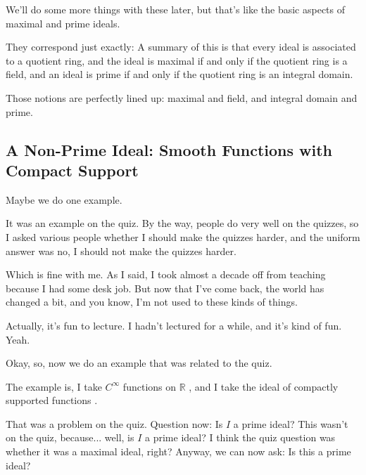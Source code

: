 \begin{speech}[01:03:02 - 01:03:44]
We'll do some more things with these later, but that's like the basic aspects of maximal and prime ideals.

They correspond just exactly: A summary of this is that every ideal is associated to a quotient ring, and the ideal is maximal if and only if the quotient ring is a field, and an ideal is prime if and only if the quotient ring is an integral domain.

Those notions are perfectly lined up: maximal and field, and integral domain and prime.
\end{speech}

\subsection{A Non-Prime Ideal: Smooth Functions with Compact Support}

\begin{speech}[01:03:44 - 01:04:41]
Maybe we do one example.

It was an example on the quiz. By the way, people do very well on the quizzes, so I asked various people whether I should make the quizzes harder, and the uniform answer was no, I should not make the quizzes harder. 

Which is fine with me. As I said, I took almost a decade off from teaching because I had some desk job. But now that I've come back, the world has changed a bit, and you know, I'm not used to these kinds of things.

Actually, it's fun to lecture. I hadn't lectured for a while, and it's kind of fun. Yeah.
\end{speech}

\begin{speech}[01:04:41 - 01:05:24]
Okay, so, now we do an example that was related to the quiz.

The example is, I take $C^\infty$ functions on $\mathbb{R}$ , and I take the ideal of compactly supported functions .

That was a problem on the quiz. Question now: Is $I$ a prime ideal?  This wasn't on the quiz, because... well, is $I$ a prime ideal? I think the quiz question was whether it was a maximal ideal, right? Anyway, we can now ask: Is this a prime ideal?
\end{speech}

